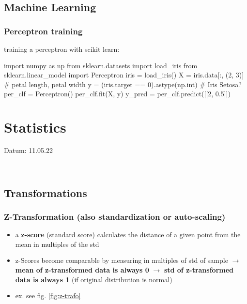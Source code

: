 \documentclass[12pt,a4paper]{article}
\begin{document}
\subsection{Machine Learning} %
\label{sub:machine_learning}

\subsubsection{Perceptron training} %
\label{ssub:perceptron_training}

training a perceptron with scikit learn:
\begin{python}
  import numpy as np
  from sklearn.datasets import load_iris
  from sklearn.linear_model import Perceptron
  iris = load_iris()
  X = iris.data[:, (2, 3)] # petal length, petal width
  y = (iris.target == 0).astype(np.int) # Iris Setosa?
  per_clf = Perceptron()
  per_clf.fit(X, y)
  y_pred = per_clf.predict([[2, 0.5]])
\end{python}




\newpage
\section{Statistics}
\addtocounter{section}{1}
Datum: 11.05.22 \ 

\noindent\hrulefill  \


\subsection{Transformations} %
\label{sub:Transformations}

\subsubsection{Z-Transformation (also standardization or auto-scaling)} %
\label{ssub:z_transformation_also_standardization_or_auto_scaling_}

\begin{itemize}
  \item a \textbf{z-score} (standard score) calculates the distance of a given point from the mean in multiples of the std
  \item z-Scores become comparable by measuring in multiples of std of sample
  \newline \indent $\longrightarrow$ \textbf{mean of z-transformed data is always 0}
  \newline \indent $\longrightarrow$ \textbf{std of z-transformed data is always 1} (if original distribution is normal)
  \item ex. see fig. \ref{fig:z-trafo}
\end{itemize}
\end{document}
